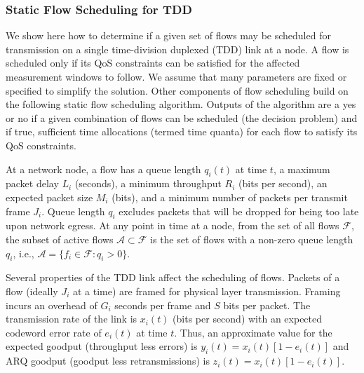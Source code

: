 \documentclass[11pt]{article}
\begin{document}
\subsubsection{Static Flow Scheduling for TDD}
We show here how to determine if a given set of flows may be scheduled for transmission on a single time-division duplexed (TDD) link at a node.  A flow is scheduled only if its QoS constraints can be satisfied for the affected measurement windows to follow.  We assume that many parameters are fixed or specified to simplify the solution.  Other components of flow scheduling build on the following static flow scheduling algorithm.  Outputs of the algorithm are a yes or no if a given combination of flows can be scheduled (the decision problem) and if true, sufficient time allocations (termed time quanta) for each flow to satisfy its QoS constraints.

At a network node, a flow has a queue length \(q_i(t)\) at time \(t\),
a maximum packet delay \(L_i\) (seconds), a minimum throughput \(R_i\) (bits per second), an expected packet size \(M_i\) (bits), and a minimum number of packets per transmit frame \(J_i\). Queue length \(q_i\) excludes packets that will be dropped for being too late upon network egress. At any point in time at a node, from the set of all flows \(\mathcal{F}\), the subset of active flows \(\mathcal{A} \subset \mathcal{F}\) is the set of flows with a non-zero queue length \(q_i\), i.e., \(\mathcal{A} = \{ f_i \in \mathcal{F} : q_i > 0 \}\).

Several properties of the TDD link affect the scheduling of flows. Packets of a flow (ideally \(J_i\) at a time) are framed for physical layer transmission.  Framing incurs an overhead of \(G_i\) seconds per frame and \(S\) bits per packet. The transmission rate of the link is \(x_i(t)\) (bits per second) with an expected codeword error rate of \(e_i(t)\) at time \(t\). Thus, an approximate value for the expected goodput (throughput less errors) is \(y_i(t)=x_i(t)[1-e_i(t)]\) and ARQ goodput (goodput less retransmissions) is \(z_i(t)=x_i(t)[1-e_i(t)]\).
\end{document}
